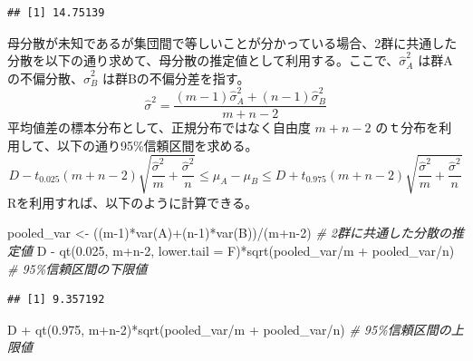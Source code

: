 \documentclass[
  ja=standard, xelatex, base=12pt]{bxjsreport}
\newenvironment{Shaded}{\begin{snugshade}}{\end{snugshade}}
\newcommand{\AttributeTok}[1]{\textcolor[rgb]{0.77,0.63,0.00}{#1}}
\newcommand{\CommentTok}[1]{\textcolor[rgb]{0.56,0.35,0.01}{\textit{#1}}}
\newcommand{\DecValTok}[1]{\textcolor[rgb]{0.00,0.00,0.81}{#1}}
\newcommand{\FloatTok}[1]{\textcolor[rgb]{0.00,0.00,0.81}{#1}}
\newcommand{\FunctionTok}[1]{\textcolor[rgb]{0.00,0.00,0.00}{#1}}
\newcommand{\NormalTok}[1]{#1}
\newcommand{\OtherTok}[1]{\textcolor[rgb]{0.56,0.35,0.01}{#1}}
\newcommand{\SpecialCharTok}[1]{\textcolor[rgb]{0.00,0.00,0.00}{#1}}
\begin{document}
\begin{verbatim}
## [1] 14.75139
\end{verbatim}

母分散が未知であるが集団間で等しいことが分かっている場合、2群に共通した分散を以下の通り求めて、母分散の推定値として利用する。ここで、\(\hat\sigma_A^2\) は群Aの不偏分散、\(\hat\sigma_B^2\) は群Bの不偏分差を指す。 \[
\hat\sigma^2=\frac{(m-1)\hat\sigma_A^2+(n-1)\hat\sigma_B^2}{m+n-2} 
\] 平均値差の標本分布として、正規分布ではなく自由度 \(m+n-2\) のｔ分布を利用して、以下の通り95\%信頼区間を求める。 \[
D-t_{0.025}(m+n-2)\sqrt{\frac{\hat\sigma^2}{m}+\frac{\hat\sigma^2}{n}}\leq\mu_A-\mu_B\leq D+t_{0.975}(m+n-2)\sqrt{\frac{\hat\sigma^2}{m}+\frac{\hat\sigma^2}{n}}
\] Rを利用すれば、以下のように計算できる。

\begin{Shaded}
\begin{Highlighting}[]
\NormalTok{pooled\_var }\OtherTok{\textless{}{-}}\NormalTok{ ((m}\DecValTok{{-}1}\NormalTok{)}\SpecialCharTok{*}\FunctionTok{var}\NormalTok{(A)}\SpecialCharTok{+}\NormalTok{(n}\DecValTok{{-}1}\NormalTok{)}\SpecialCharTok{*}\FunctionTok{var}\NormalTok{(B))}\SpecialCharTok{/}\NormalTok{(m}\SpecialCharTok{+}\NormalTok{n}\DecValTok{{-}2}\NormalTok{)  }\CommentTok{\# 2群に共通した分散の推定値}
\NormalTok{D }\SpecialCharTok{{-}} \FunctionTok{qt}\NormalTok{(}\FloatTok{0.025}\NormalTok{, m}\SpecialCharTok{+}\NormalTok{n}\DecValTok{{-}2}\NormalTok{, }\AttributeTok{lower.tail =}\NormalTok{ F)}\SpecialCharTok{*}\FunctionTok{sqrt}\NormalTok{(pooled\_var}\SpecialCharTok{/}\NormalTok{m }\SpecialCharTok{+}\NormalTok{ pooled\_var}\SpecialCharTok{/}\NormalTok{n)  }\CommentTok{\# 95\%信頼区間の下限値}
\end{Highlighting}
\end{Shaded}

\begin{verbatim}
## [1] 9.357192
\end{verbatim}

\begin{Shaded}
\begin{Highlighting}[]
\NormalTok{D }\SpecialCharTok{+} \FunctionTok{qt}\NormalTok{(}\FloatTok{0.975}\NormalTok{, m}\SpecialCharTok{+}\NormalTok{n}\DecValTok{{-}2}\NormalTok{)}\SpecialCharTok{*}\FunctionTok{sqrt}\NormalTok{(pooled\_var}\SpecialCharTok{/}\NormalTok{m }\SpecialCharTok{+}\NormalTok{ pooled\_var}\SpecialCharTok{/}\NormalTok{n)                  }\CommentTok{\# 95\%信頼区間の上限値}
\end{Highlighting}
\end{Shaded}
\end{document}
